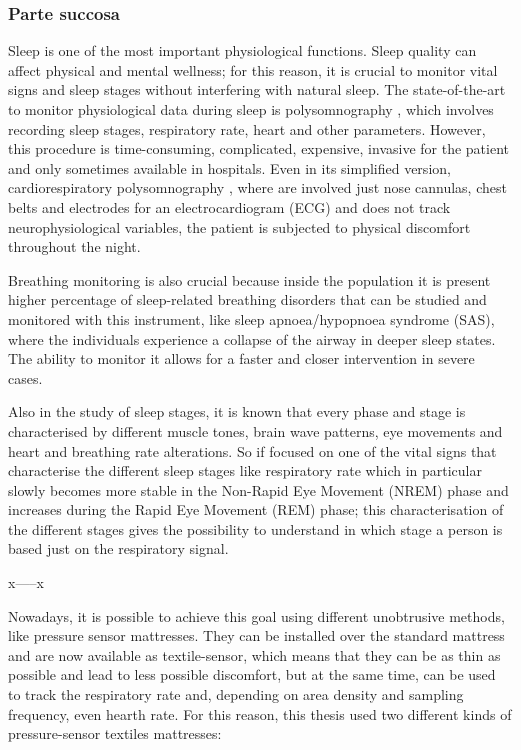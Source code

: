 \newpage


\subsubsection{Parte succosa}
Sleep is one of the most important physiological functions. Sleep quality can affect physical 
and mental wellness; for this reason, it is crucial to monitor vital signs and sleep stages without interfering with natural sleep. 
The state-of-the-art to monitor physiological data during sleep is polysomnography \cite{Penzel2016ModulationsPolysomnography}, which involves recording sleep stages, respiratory rate, heart and other parameters. However, this procedure is time-consuming, complicated, expensive,
 invasive for the patient and only sometimes available in hospitals. Even in its simplified version, cardiorespiratory polysomnography \cite{CallejaComparisonApnoea}, where are involved just nose cannulas, chest belts and electrodes for an electrocardiogram (ECG) and does not track neurophysiological variables, the patient is subjected to physical discomfort throughout the night.

Breathing monitoring is also crucial because inside the population it is present higher percentage of 
sleep-related breathing disorders that can be studied and monitored with this instrument, like sleep apnoea/hypopnoea syndrome (SAS), 
where the individuals experience a collapse 
of the airway in deeper sleep states. The ability to monitor it allows for a faster and closer intervention in severe cases. 

Also in the study of sleep stages, it is known that every phase and stage is characterised by different muscle tones, brain wave patterns, eye movements and heart and breathing rate alterations.
So if focused on one of the vital signs that characterise the different sleep stages like respiratory rate which in particular slowly becomes more stable in the Non-Rapid Eye Movement (NREM) phase and increases during the Rapid Eye Movement (REM) phase; this characterisation of the different stages gives the possibility to understand in which stage a person is based just on the respiratory signal.

x-----x


Nowadays, it is possible to achieve this goal using different unobtrusive methods, like pressure sensor mattresses.
They can be installed over the standard mattress and are now available as textile-sensor, which means that they can be as thin as possible and lead to less possible discomfort, but at the same time, can be used to track the respiratory rate and, depending on area density and sampling frequency, even hearth rate. For this reason, this thesis used two different kinds of pressure-sensor textiles mattresses:

